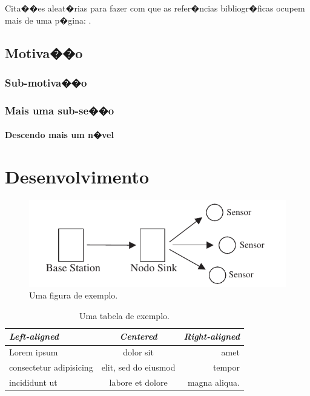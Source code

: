 \documentclass[phd]{ppgccufmg}    %
\begin{document}
Cita��es aleat�rias para fazer com que as refer�ncias bibliogr�ficas ocupem
mais de uma p�gina: \cite{bichsel92simple, dror01statistics, guisser92new}.


\section{Motiva��o}

\dummytxtb\dummytxta

\subsection{Sub-motiva��o}


\dummytxtc\dummytxtb

\subsection{Mais uma sub-se��o}

\dummytxta\dummytxtc

\subsubsection{Descendo mais um n�vel}

\dummytxtb\dummytxta


\chapter{Desenvolvimento}

\dummytxtb\dummytxta\dummytxtc

\begin{figure}[t]
    \centering
    \includegraphics{img/exemplo}
    \caption{Uma figura de exemplo.}
    \label{fig:exemplo}
\end{figure}

\dummytxtb\dummytxta\dummytxtc\dummytxtb

\begin{table}[t]
    \caption{Uma tabela de exemplo.}
    {\centering
    \begin{tabular}{lcr} \toprule
    \emph{Left-aligned} & \emph{Centered} & \emph{Right-aligned} \\ \midrule
    Lorem ipsum & dolor sit & amet \\
    consectetur adipisicing & elit, sed do eiusmod & tempor \\
    incididunt ut & labore et dolore & magna aliqua. \\ \bottomrule
    \end{tabular}\par
    }
\end{table}
\end{document}
